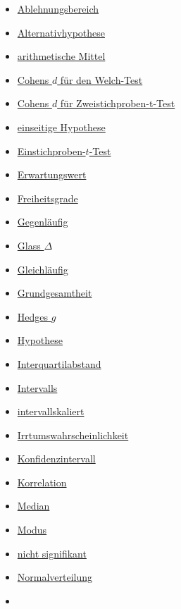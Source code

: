 \documentclass[
]{book}
\providecommand{\tightlist}{%
  \setlength{\itemsep}{0pt}\setlength{\parskip}{0pt}}
\theoremstyle{definition}
\theoremstyle{definition}
\theoremstyle{definition}
\theoremstyle{definition}
\theoremstyle{remark}
\begin{document}
\begin{itemize}
\tightlist
\item
  \hyperref[customdef-ablehnungsbereich]{Ablehnungsbereich}
\item
  \hyperref[customdef-alternativhypothese]{Alternativhypothese}
\item
  \hyperref[customdef-arithmetisches-mittel]{arithmetische Mittel}
\item
  \hyperref[customdef-welch-cohens-d]{Cohens \(d\) für den Welch-Test}
\item
  \hyperref[customdef-cohens-d]{Cohens \(d\) für Zweistichproben-t-Test}
\item
  \hyperref[customdef-einseitige-hypothese]{einseitige Hypothese}
\item
  \hyperref[customdef-t-test]{Einstichproben-\(t\)-Test}
\item
  \hyperref[customdef-erwartungswert]{Erwartungswert}
\item
  \hyperref[customdef-freiheitsgrade]{Freiheitsgrade}
\item
  \hyperref[customdef-gegenlaeufig]{Gegenläufig}
\item
  \hyperref[customdef-glass-delta]{Glass \(\Delta\)}
\item
  \hyperref[customdef-gleichlaeufig]{Gleichläufig}
\item
  \hyperref[customdef-grundgesamtheit]{Grundgesamtheit}
\item
  \hyperref[customdef-hedges-g]{Hedges \(g\)}
\item
  \hyperref[customdef-hypothese]{Hypothese}
\item
  \hyperref[customdef-iqr]{Interquartilabstand}
\item
  \hyperref[customdef-interval]{Intervalls}
\item
  \hyperref[customdef-intervallskaliert]{intervallskaliert}
\item
  \hyperref[customdef-erring-level]{Irrtumswahrscheinlichkeit}
\item
  \hyperref[customdef-confidence-interval]{Konfidenzintervall}
\item
  \hyperref[customdef-korrelation]{Korrelation}
\item
  \hyperref[customdef-median]{Median}
\item
  \hyperref[customdef-modus]{Modus}
\item
  \hyperref[customdef-signifikanz]{nicht signifikant}
\item
  \hyperref[customdef-normalverteilung]{Normalverteilung}
\item

\end{itemize}
\end{document}
